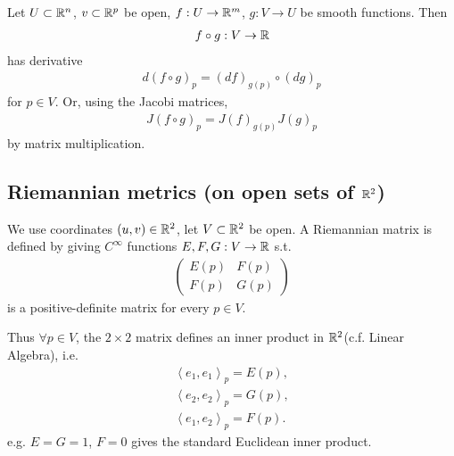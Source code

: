\documentclass[a4paper]{article}
\begin{document}
Let $U \subset \mathbb{R}^n$, $v \subset \mathbb{R}^p$ be open, $f:U \to \mathbb{R}^m$, $g: V \to U$ be smooth functions. Then
\begin{equation*}
\begin{aligned}
f \circ g : V \to \mathbb{R}
\end{aligned}
\end{equation*}
has derivative
\begin{equation*}
\begin{aligned}
d(f\circ g)_p = (df)_{g(p)} \circ (dg)_p
\end{aligned}
\end{equation*}
for $p \in V$. Or, using the Jacobi matrices,
\begin{equation*}
\begin{aligned}
J(f \circ g)_p = J(f)_{g(p)} J(g)_p
\end{aligned}
\end{equation*}
by matrix multiplication.

\subsection{Riemannian metrics (on open sets of $\mathbb{R}^2$)}
We use coordinates $(u,v) \in \mathbb{R}^2$, let $V \subset \mathbb{R}^2$ be open. A Riemannian matrix is defined by giving $C^\infty$ functions $E,F,G: V \to \mathbb{R}$ s.t. 
\begin{equation*}
\begin{aligned}
\left(\begin{matrix}
E(p) & F(p)\\
F(p) & G(p)
\end{matrix}\right)
\end{aligned}
\end{equation*}
is a positive-definite matrix for every $p \in V$.

Thus $\forall p \in V$, the $2 \times 2$ matrix defines an inner product in $\mathbb{R}^2$(c.f. Linear Algebra), i.e.
\begin{equation*}
\begin{aligned}
\left<e_1,e_1\right>_p = E(p),\\
\left<e_2,e_2\right>_p = G(p),\\
\left<e_1,e_2\right>_p = F(p).
\end{aligned}
\end{equation*}
e.g. $E=G=1$, $F=0$ gives the standard Euclidean inner product.
\end{document}
